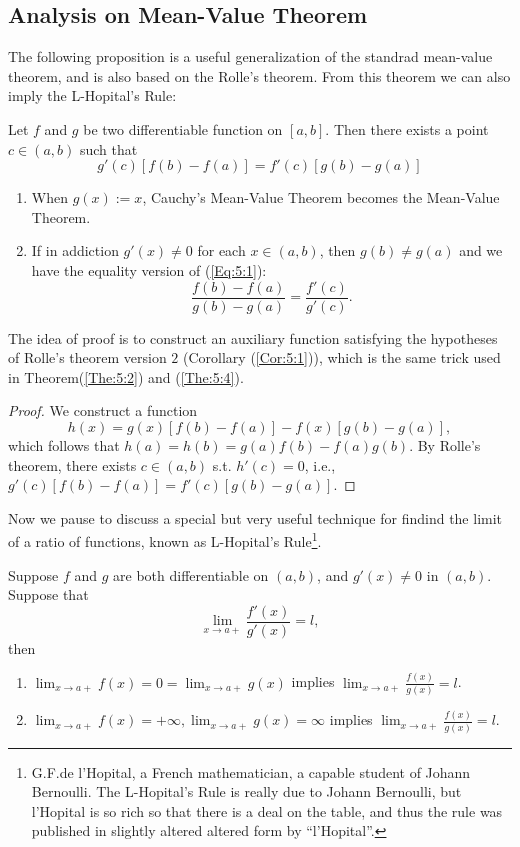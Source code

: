 \subsection{Analysis on Mean-Value Theorem}
The following proposition is a useful generalization of the standrad mean-value theorem, and is also based on the Rolle's theorem. From this theorem we can also imply the L-Hopital's Rule:
\begin{theorem}
Let $f$ and $g$ be two differentiable function on $[a,b].$ Then there exists a point $c\in(a,b)$ such that
\begin{equation}
g'(c)[f(b) - f(a)] = f'(c)[g(b) - g(a)]\label{Eq:5:1}
\end{equation}
\end{theorem}
\begin{remark}
\begin{enumerate}
\item
When $g(x):=x$, Cauchy's Mean-Value Theorem becomes the Mean-Value Theorem.
\item
If in addiction $g'(x)\ne0$ for each $x\in(a,b)$, then $g(b)\ne g(a)$ and we have the equality version of (\ref{Eq:5:1}):
\[
\frac{f(b) - f(a)}{g(b) - g(a)}=\frac{f'(c)}{g'(c)}.
\]
\end{enumerate}
\end{remark}
The idea of proof is to construct an auxiliary function satisfying the hypotheses of Rolle's theorem version $2$ (Corollary (\ref{Cor:5:1})), which is the same trick used in Theorem(\ref{The:5:2}) and (\ref{The:5:4}).
\begin{proof}
We construct a function
\[
h(x) = g(x)[f(b) - f(a)] - f(x)[g(b) - g(a)],
\]
which follows that $h(a)=h(b)=g(a)f(b)-f(a)g(b)$. By Rolle's theorem, there exists $c\in(a,b)$ s.t. $h'(c)=0$, i.e., $g'(c)[f(b) - f(a)] = f'(c)[g(b) - g(a)]$.
\end{proof}
Now we pause to discuss a special but very useful technique for findind the limit of a ratio of functions, known as L-Hopital's Rule\footnote{
G.F.de l'Hopital, a French mathematician, a capable student of Johann Bernoulli. The L-Hopital's Rule is really due to Johann Bernoulli, but l'Hopital is so rich so that there is a deal on the table, and thus the rule was published in slightly altered altered form by ``l'Hopital''.
}.
\begin{theorem}
Suppose $f$ and $g$ are both differentiable on $(a,b)$, and $g'(x)\ne0$ in $(a,b)$. Suppose that
\[
\lim_{x\to a+}\frac{f'(x)}{g'(x)}=l,
\]
then
\begin{enumerate}
\item
$\lim_{x\to a+}f(x)=0=\lim_{x\to a+}g(x)$ implies $\lim_{x\to a+}\frac{f(x)}{g(x)}=l$.
\item
$\lim_{x\to a+}f(x)=+\infty,\lim_{x\to a+}g(x)=\infty$ implies $\lim_{x\to a+}\frac{f(x)}{g(x)}=l$.
\end{enumerate}
\end{theorem}
